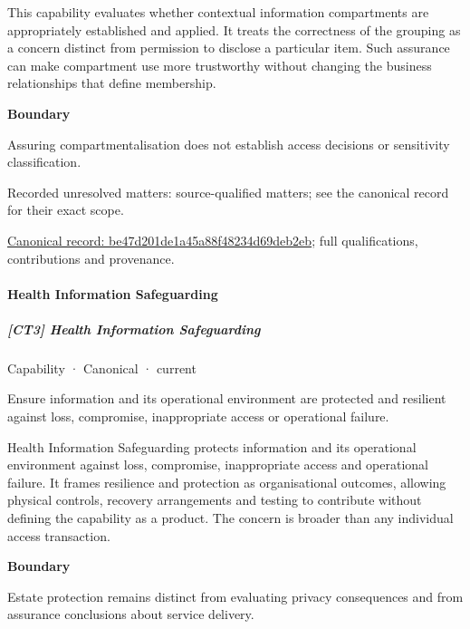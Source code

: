 This capability evaluates whether contextual information compartments are appropriately established and applied. It treats the correctness of the grouping as a concern distinct from permission to disclose a particular item. Such assurance can make compartment use more trustworthy without changing the business relationships that define membership.



\textbf{Boundary}



Assuring compartmentalisation does not establish access decisions or sensitivity classification.


{\small Recorded unresolved matters: source-qualified matters; see the canonical record for their exact scope.}\par
{\footnotesize \href{../../../../continuum/strategy/capability/be47d201de1a45a88f48234d69deb2eb.md}{Canonical record: be47d201de1a45a88f48234d69deb2eb}; full qualifications, contributions and provenance.}\par
\paragraph{Health Information Safeguarding}

\subparagraph{[CT3] Health Information Safeguarding}

\label{element:6e89db75de5b4c4c9274f78c8d9e665a}
{\small Capability · Canonical · current}\par

Ensure information and its operational environment are protected and resilient against loss, compromise, inappropriate access or operational failure.



Health Information Safeguarding protects information and its operational environment against loss, compromise, inappropriate access and operational failure. It frames resilience and protection as organisational outcomes, allowing physical controls, recovery arrangements and testing to contribute without defining the capability as a product. The concern is broader than any individual access transaction.



\textbf{Boundary}



Estate protection remains distinct from evaluating privacy consequences and from assurance conclusions about service delivery.


